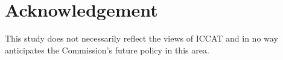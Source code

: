 \documentclass[%
nonumbib,      %
%
]{nrc1}                          %
\begin{document}



\section{Acknowledgement}

This study does not necessarily reflect the views of ICCAT and in no way anticipates the Commission's future policy in this area. 

\newpage\clearpage




\newpage\clearpage
\end{document}
